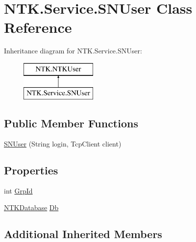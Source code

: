 \hypertarget{class_n_t_k_1_1_service_1_1_s_n_user}{}\section{N\+T\+K.\+Service.\+S\+N\+User Class Reference}
\label{class_n_t_k_1_1_service_1_1_s_n_user}


 


Inheritance diagram for N\+T\+K.\+Service.\+S\+N\+User\+:\begin{figure}[H]
\begin{center}
\leavevmode
\includegraphics[height=2.000000cm]{db/d99/class_n_t_k_1_1_service_1_1_s_n_user}
\end{center}
\end{figure}
\subsection*{Public Member Functions}
\begin{DoxyCompactItemize}
\item 
\mbox{\hyperlink{class_n_t_k_1_1_service_1_1_s_n_user_aef6d4b61dc52e2d1f149088c5f8c6dd7}{S\+N\+User}} (String login, Tcp\+Client client)
\end{DoxyCompactItemize}
\subsection*{Properties}
\begin{DoxyCompactItemize}
\item 
int \mbox{\hyperlink{class_n_t_k_1_1_service_1_1_s_n_user_a55fb294d67c8861d7a8d72871f9e5eee}{Grp\+Id}}
\item 
\mbox{\hyperlink{class_n_t_k_1_1_database_1_1_n_t_k_database}{N\+T\+K\+Database}} \mbox{\hyperlink{class_n_t_k_1_1_service_1_1_s_n_user_ae3e3ebbb93f1c9f50321a407393dc167}{Db}}
\end{DoxyCompactItemize}
\subsection*{Additional Inherited Members}


